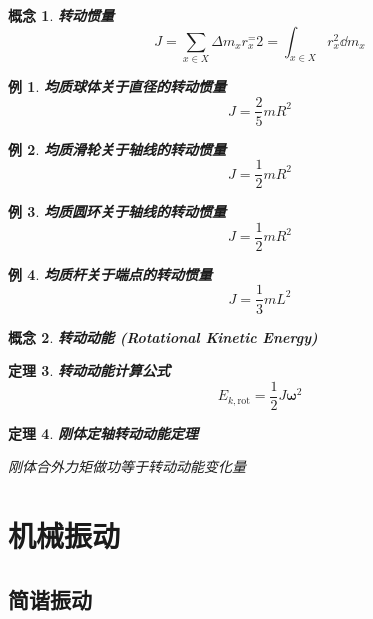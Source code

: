 \documentclass[UTF8]{ctexart}
\newcommand{\<}{\langle}
\renewcommand{\>}{\rangle}                              %
\newenvironment{dfn_box}{
    \begin{tcolorbox}[enhanced, colback=dfn_green2, boxrule=0pt, frame hidden,
        borderline west={0.7mm}{0.1mm}{dfn_green1},breakable]
    }
    {\end{tcolorbox}}
\newenvironment{thm_box}{
    \begin{tcolorbox}[enhanced, colback=thm_blue2, boxrule=0pt, frame hidden,
        borderline west={0.7mm}{0.1mm}{thm_blue1},breakable]
    }
    {\end{tcolorbox}}
\newenvironment{xmp_box}{
    \begin{tcolorbox}[enhanced, colback=xmp_purple2, boxrule=0pt, frame hidden,
        borderline west={0.7mm}{0.1mm}{xmp_purple1},breakable]
    }
    {\end{tcolorbox}}
\theoremstyle{MyStyle} %
\newtheorem{definition}{概念}[subsection]
\newenvironment{cpt}{\begin{dfn_box}\begin{definition}}{\end{definition}\end{dfn_box}}
\newtheorem{theorem}[definition]{定理}
\newenvironment{thm}{\begin{thm_box}\begin{theorem}}{\end{theorem}\end{thm_box}}
\newtheorem{example}{例}[definition]
\newenvironment{xmp}{\begin{xmp_box}\begin{example}}{\end{example}\end{xmp_box}}
\begin{document}
            \begin{cpt}
                \textbf{转动惯量}
                \[J=\sum_{x\in X}\Delta m_x r_x^=2=\int_{x\in X}r_x^2\dd m_x\]
            \end{cpt}
            
            \begin{xmp}
                \textbf{均质球体关于直径的转动惯量}
                \[J=\frac{2}{5}mR^2\]
            \end{xmp}
            
            \begin{xmp}
                \textbf{均质滑轮关于轴线的转动惯量}
                \[J=\frac{1}{2}mR^2\]
            \end{xmp}
            
            \begin{xmp}
                \textbf{均质圆环关于轴线的转动惯量}
                \[J=\frac{1}{2}mR^2\]
            \end{xmp}
            
            \begin{xmp}
                \textbf{均质杆关于端点的转动惯量}
                \[J=\frac{1}{3}mL^2\]
            \end{xmp}
            
            \begin{cpt}
                \textbf{转动动能 (Rotational Kinetic Energy)}
            \end{cpt}
            
            \begin{thm}
                \textbf{转动动能计算公式}
                \[E_{k,\text{rot}}=\frac{1}{2}J\bm{\omega}^2\]
            \end{thm}
            
            \begin{thm}
                \textbf{刚体定轴转动动能定理}

                刚体合外力矩做功等于转动动能变化量
            \end{thm}

    \section{机械振动}

        \subsection{简谐振动}
            
\end{document}
